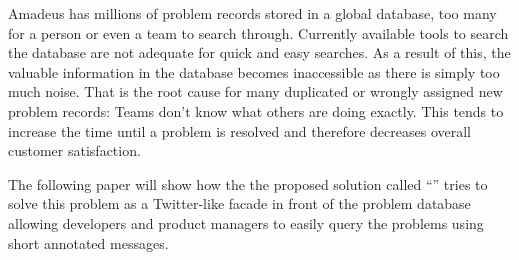 Amadeus has millions of problem records stored in a global database, too many for a person or even a team to search through. Currently available tools to search the database are not adequate for quick and easy searches. As a result of this, the valuable information in the database becomes inaccessible as there is simply too much noise. That is the root cause for many duplicated or wrongly assigned new problem records: Teams don't know what others are doing exactly. This tends to increase the time until a problem is resolved and therefore decreases overall customer satisfaction.

The following paper will show how the the proposed solution called \enquote{\reporttitle} tries to solve this problem as a Twitter-like facade in front of the problem database allowing developers and product managers to easily query the problems using short annotated messages.
